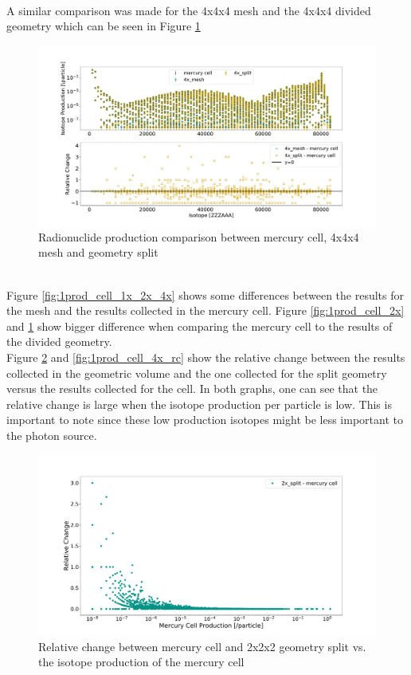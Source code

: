 %
\\
A similar comparison was made for the 4x4x4 mesh and the 4x4x4 divided geometry
which can be seen in Figure \ref{fig:1prod_cell_4x}
%
\begin{figure}[h!]
 \centering
 \includegraphics[scale=0.42,trim={3cm 1cm 3cm 3cm},clip]{../figs/toy_p1/prod_VPI_4x.pdf}
 \caption{Radionuclide production comparison between mercury cell, 4x4x4 mesh and geometry split}
 \label{fig:1prod_cell_4x}
\end{figure}
%
\\
Figure \ref{fig:1prod_cell_1x_2x_4x} shows some differences between the
results for the mesh and the results collected in the mercury cell. Figure
\ref{fig:1prod_cell_2x} and \ref{fig:1prod_cell_4x} show bigger difference when
comparing the mercury cell to the results of the divided geometry.\\
Figure \ref{fig:1prod_cell_2x_rc} and \ref{fig:1prod_cell_4x_rc} show the
relative change between the results collected in the geometric volume and the
one collected for the split geometry versus the results collected for the cell.
In both graphs, one can see that the relative change is large when the isotope
production per particle is low. This is important to note since these low
production isotopes might be less important to the photon source.
%
\begin{figure}[h!]
 \centering
 \includegraphics[scale=0.42,trim={3cm 0.5cm 3cm 3cm},clip]{../figs/toy_p1/prod_VPI_rc_2x_split.pdf}
 \caption{Relative change between mercury cell and 2x2x2 geometry split vs. the isotope production of the mercury cell}
 \label{fig:1prod_cell_2x_rc}
\end{figure}
